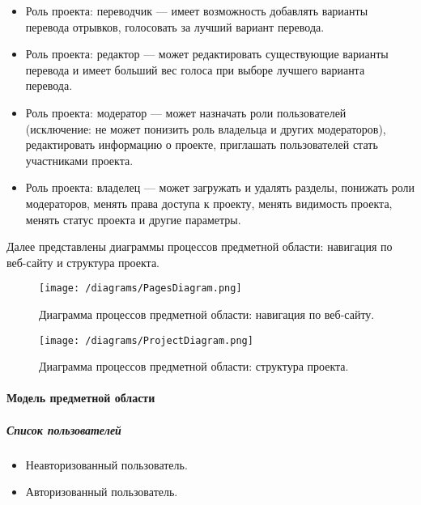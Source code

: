 \documentclass[a4paper,12pt]{article}
\begin{document}
\begin{itemize}
\item Роль проекта: переводчик — имеет возможность добавлять варианты перевода отрывков, голосовать за лучший вариант перевода.
\item Роль проекта: редактор — может редактировать существующие варианты перевода и имеет больший вес голоса при выборе лучшего варианта перевода.
\item Роль проекта: модератор — может назначать роли пользователей (исключение: не может понизить роль владельца и других модераторов), редактировать информацию о проекте, приглашать пользователей стать участниками проекта.
\item Роль проекта: владелец — может загружать и удалять разделы, понижать роли модераторов, менять права доступа к проекту, менять видимость проекта, менять статус проекта и другие параметры.
\end{itemize}

Далее представлены диаграммы процессов предметной области: навигация по веб-сайту и структура проекта.\\

\begin{figure}[H]
\centering
\texttt{[image: /diagrams/PagesDiagram.png]}
\caption{Диаграмма процессов предметной области: навигация по веб-сайту.}
\label{fig:diagrampages}
\end{figure}

\begin{figure}[H]
\centering
\texttt{[image: /diagrams/ProjectDiagram.png]}
\caption{Диаграмма процессов предметной области: структура проекта.}
\label{fig:diagramproject}
\end{figure}

\paragraph{Модель предметной области}
\subparagraph{Список пользователей}
\begin{itemize}
\item Неавторизованный пользователь.
\item Авторизованный пользователь.
\end{itemize}
\end{document}
